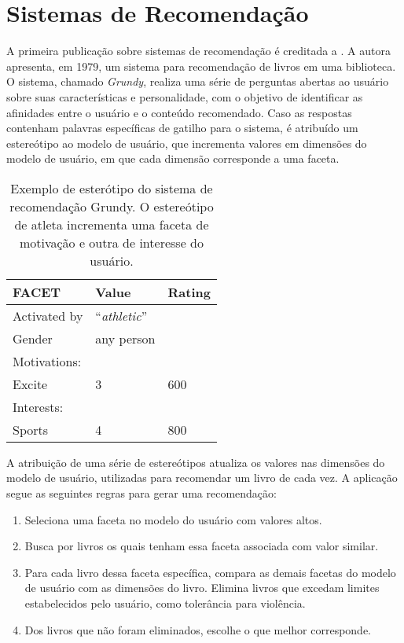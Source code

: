 \section{Sistemas de Recomendação}
A primeira publicação sobre sistemas de recomendação é creditada a
\citet{rich1979user}. A autora apresenta, em 1979, um sistema para recomendação
de livros em uma biblioteca. O sistema, chamado \textit{Grundy}, realiza uma
série de perguntas abertas ao usuário sobre suas características e
personalidade, com o objetivo de identificar as afinidades entre o usuário e o
conteúdo recomendado. Caso as respostas contenham palavras específicas de
gatilho para o sistema, é atribuído um estereótipo ao modelo de usuário, que
incrementa valores em dimensões do modelo de usuário, em que cada dimensão
corresponde a uma faceta.

\vspace{2em}
\begin{table}[h!]
   \begin{center}
      \begin{tabular}{|m{3cm}|m{2cm}|m{2cm}|}
          \hline
          \textbf{FACET} & \textbf{Value} & \textbf{Rating} \\
          \hline
          Activated by & ``\textit{athletic}'' & \\
          Gender & any person & \\
          \hline
          Motivations: & & \\
          \hspace{1mm} Excite & 3 & 600 \\
          \hline
          Interests: & & \\
          \hspace{1mm} Sports & 4 & 800 \\
          \hline
      \end{tabular}
      \caption{Exemplo de esterótipo do sistema de recomendação Grundy. O estereótipo de atleta incrementa uma faceta de motivação e outra de interesse do usuário.}
      \label{grundy}
   \end{center}
   \end{table}

A atribuição de uma série de estereótipos atualiza os valores nas dimensões do
modelo de usuário, utilizadas para recomendar um livro de cada vez. A aplicação
segue as seguintes regras para gerar uma recomendação:

\begin{enumerate}
   \item Seleciona uma faceta no modelo do usuário com valores altos.
   \item Busca por livros os quais tenham essa faceta associada com valor similar.
   \item Para cada livro dessa faceta específica, compara as demais facetas
   do modelo de usuário com as dimensões do livro. Elimina livros que excedam
   limites estabelecidos pelo usuário, como tolerância para violência.
   \item Dos livros que não foram eliminados, escolhe o que melhor corresponde.
\end{enumerate}

